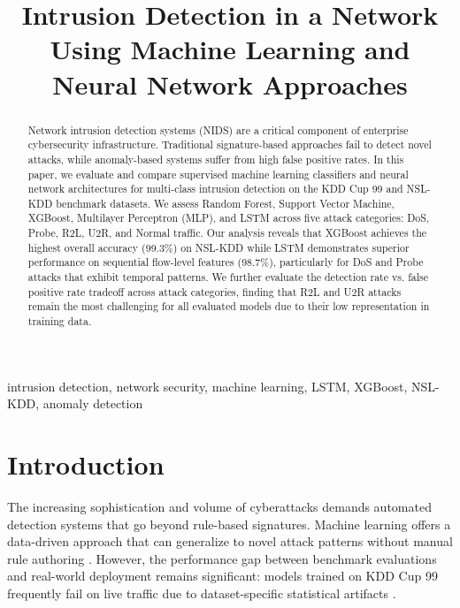 \documentclass[conference]{IEEEtran}
\begin{document}
\title{Intrusion Detection in a Network Using Machine Learning and Neural Network Approaches}

\author{
}

\maketitle

\begin{abstract}
Network intrusion detection systems (NIDS) are a critical component of enterprise cybersecurity infrastructure. Traditional signature-based approaches fail to detect novel attacks, while anomaly-based systems suffer from high false positive rates. In this paper, we evaluate and compare supervised machine learning classifiers and neural network architectures for multi-class intrusion detection on the KDD Cup 99 and NSL-KDD benchmark datasets. We assess Random Forest, Support Vector Machine, XGBoost, Multilayer Perceptron (MLP), and LSTM across five attack categories: DoS, Probe, R2L, U2R, and Normal traffic. Our analysis reveals that XGBoost achieves the highest overall accuracy (99.3\%) on NSL-KDD while LSTM demonstrates superior performance on sequential flow-level features (98.7\%), particularly for DoS and Probe attacks that exhibit temporal patterns. We further evaluate the detection rate vs. false positive rate tradeoff across attack categories, finding that R2L and U2R attacks remain the most challenging for all evaluated models due to their low representation in training data.
\end{abstract}

\begin{IEEEkeywords}
intrusion detection, network security, machine learning, LSTM, XGBoost, NSL-KDD, anomaly detection
\end{IEEEkeywords}

\section{Introduction}

The increasing sophistication and volume of cyberattacks demands automated detection systems that go beyond rule-based signatures. Machine learning offers a data-driven approach that can generalize to novel attack patterns without manual rule authoring \cite{liao2013intrusion}. However, the performance gap between benchmark evaluations and real-world deployment remains significant: models trained on KDD Cup 99 frequently fail on live traffic due to dataset-specific statistical artifacts \cite{tavallaee2009detailed}.
\end{document}
